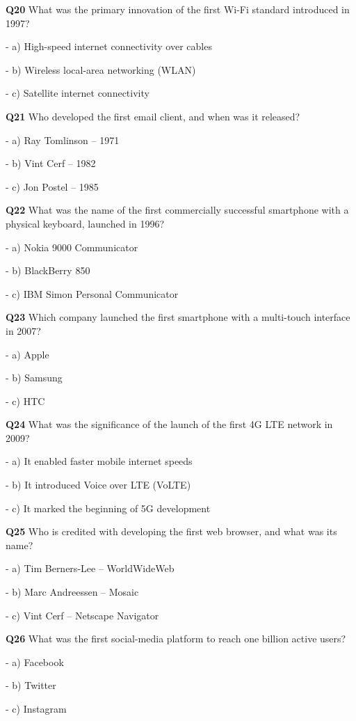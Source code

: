 \textbf{Q20} What was the primary innovation of the first Wi-Fi standard introduced in 1997?\par
\quad - a) High-speed internet connectivity over cables\par
\quad - b) Wireless local-area networking (WLAN)\par
\quad - c) Satellite internet connectivity\par

\textbf{Q21} Who developed the first email client, and when was it released?\par
\quad - a) Ray Tomlinson – 1971\par
\quad - b) Vint Cerf – 1982\par
\quad - c) Jon Postel – 1985\par

\textbf{Q22} What was the name of the first commercially successful smartphone with a physical keyboard, launched in 1996?\par
\quad - a) Nokia 9000 Communicator\par
\quad - b) BlackBerry 850\par
\quad - c) IBM Simon Personal Communicator\par

\textbf{Q23} Which company launched the first smartphone with a multi-touch interface in 2007?\par
\quad - a) Apple\par
\quad - b) Samsung\par
\quad - c) HTC\par

\textbf{Q24} What was the significance of the launch of the first 4G LTE network in 2009?\par
\quad - a) It enabled faster mobile internet speeds\par
\quad - b) It introduced Voice over LTE (VoLTE)\par
\quad - c) It marked the beginning of 5G development\par

\textbf{Q25} Who is credited with developing the first web browser, and what was its name?\par
\quad - a) Tim Berners-Lee – WorldWideWeb\par
\quad - b) Marc Andreessen – Mosaic\par
\quad - c) Vint Cerf – Netscape Navigator\par

\textbf{Q26} What was the first social-media platform to reach one billion active users?\par
\quad - a) Facebook\par
\quad - b) Twitter\par
\quad - c) Instagram\par

